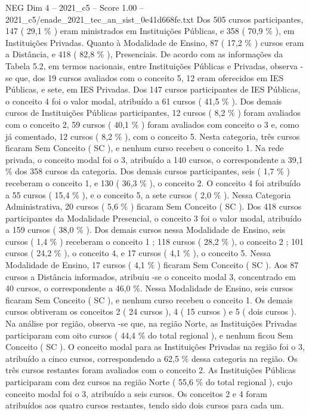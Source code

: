 \begin{textsample}{NEG Dim 4 – 2021\_c5 – Score 1.00 – 2021\_c5/enade\_2021\_tec\_an\_sist\_0e41d668fe.txt}
Dos 505 cursos participantes, 147 ( 29,1 \% ) eram ministrados em Instituições Públicas, e 358 ( 70,9 \% ), em Instituições Privadas.
Quanto à Modalidade de Ensino, 87 ( 17,2 \% ) cursos eram a Distância, e 418 ( 82,8 \% ), Presenciais.
De acordo com as informações da Tabela 5.2, em termos nacionais, entre Instituições Públicas e Privadas, observa -se que, dos 19 cursos avaliados com o conceito 5, 12 eram oferecidos em IES Públicas, e sete, em IES Privadas.
Dos 147 cursos participantes de IES Públicas, o conceito 4 foi o valor modal, atribuído a 61 cursos ( 41,5 \% ).
Dos demais cursos de Instituições Públicas participantes, 12 cursos ( 8,2 \% ) foram avaliados com o conceito 2, 59 cursos ( 40,1 \% ) foram avaliados com conceito o 3 e, como já comentado, 12 cursos ( 8,2 \% ), com o conceito 5.
Nesta categoria, três cursos ficaram Sem Conceito ( SC ), e nenhum curso recebeu o conceito 1.
Na rede privada, o conceito modal foi o 3, atribuído a 140 cursos, o correspondente a 39,1 \% dos 358 cursos da categoria.
Dos demais cursos participantes, seis ( 1,7 \% ) receberam o conceito 1, e 130 ( 36,3 \% ), o conceito 2.
O conceito 4 foi atribuído a 55 cursos ( 15,4 \% ), e o conceito 5, a sete cursos ( 2,0 \% ).
Nessa Categoria Administrativa, 20 cursos ( 5,6 \% ) ficaram Sem Conceito ( SC ).
Dos 418 cursos participantes da Modalidade Presencial, o conceito 3 foi o valor modal, atribuído a 159 cursos ( 38,0 \% ).
Dos demais cursos nessa Modalidade de Ensino, seis cursos ( 1,4 \% ) receberam o conceito 1 ; 118 cursos ( 28,2 \% ), o conceito 2 ; 101 cursos ( 24,2 \% ), o conceito 4, e 17 cursos ( 4,1 \% ), o conceito 5.
Nessa Modalidade de Ensino, 17 cursos ( 4,1 \% ) ficaram Sem Conceito ( SC ).
Aos 87 cursos a Distância informados, atribuiu -se o conceito modal 3, concentrado em 40 cursos, o correspondente a 46,0 \%.
Nessa Modalidade de Ensino, seis cursos ficaram Sem Conceito ( SC ), e nenhum curso recebeu o conceito 1.
Os demais cursos obtiveram os conceitos 2 ( 24 cursos ), 4 ( 15 cursos ) e 5 ( dois cursos ).
Na análise por região, observa -se que, na região Norte, as Instituições Privadas participaram com oito cursos ( 44,4 \% do total regional ), e nenhum ficou Sem Conceito ( SC ).
O conceito modal para as Instituições Privadas na região foi o 3, atribuído a cinco cursos, correspondendo a 62,5 \% dessa categoria na região.
Os três cursos restantes foram avaliados com o conceito 2.
As Instituições Públicas participaram com dez cursos na região Norte ( 55,6 \% do total regional ), cujo conceito modal foi o 3, atribuído a seis cursos.
Os conceitos 2 e 4 foram atribuídos aos quatro cursos restantes, tendo sido dois cursos para cada um.

\end{textsample}
